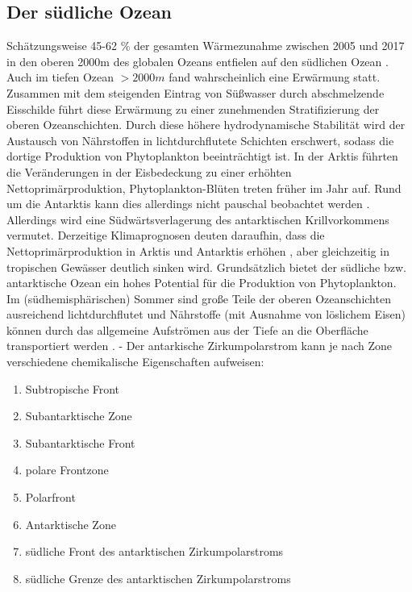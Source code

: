 \documentclass[12pt,a4paper,onecolumn,draft]{scrartcl}
\begin{document}
\subsection{Der südliche Ozean}
Schätzungsweise 45-62 \% der gesamten Wärmezunahme zwischen 2005 und 2017 in den oberen 2000m des globalen Ozeans entfielen auf den südlichen Ozean \citep{IPCCpol.2019}. Auch im tiefen Ozean $>2000m$ fand wahrscheinlich eine Erwärmung statt. Zusammen mit dem steigenden Eintrag von Süßwasser durch abschmelzende Eisschilde führt diese Erwärmung zu  einer zunehmenden Stratifizierung der oberen Ozeanschichten. Durch diese höhere hydrodynamische Stabilität wird  der Austausch von Nährstoffen in lichtdurchflutete Schichten erschwert, sodass die dortige Produktion von Phytoplankton beeinträchtigt ist. In der Arktis führten die Veränderungen in der Eisbedeckung zu einer erhöhten Nettoprimärproduktion, Phytoplankton-Blüten treten früher im Jahr auf. Rund um die Antarktis kann dies allerdings nicht pauschal beobachtet werden \citep{IPCCpol.2019}. Allerdings wird eine Südwärtsverlagerung des antarktischen Krillvorkommens vermutet. Derzeitige Klimaprognosen deuten daraufhin, dass die Nettoprimärproduktion in Arktis und Antarktis erhöhen , aber gleichzeitig in tropischen Gewässer deutlich sinken wird. Grundsätzlich bietet der südliche bzw. antarktische Ozean ein hohes Potential für die Produktion von Phytoplankton. Im (südhemisphärischen) Sommer sind große Teile der oberen Ozeanschichten ausreichend lichtdurchflutet und Nährstoffe (mit Ausnahme von löslichem Eisen) können durch das allgemeine Aufströmen aus der Tiefe an die Oberfläche transportiert werden \citep{Martin.1990}. -  Der antarkische Zirkumpolarstrom kann je nach Zone verschiedene chemikalische Eigenschaften aufweisen:

\begin{enumerate}
\item Subtropische Front
\item Subantarktische Zone
\item Subantarktische Front
\item polare Frontzone
\item Polarfront
\item Antarktische Zone
\item südliche Front des antarktischen Zirkumpolarstroms
\item südliche Grenze des antarktischen Zirkumpolarstroms
\end{enumerate}
\end{document}
